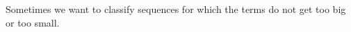\documentclass{ximera}
\begin{document}
%

Sometimes we want to classify sequences for which the terms do not get too big or too
small.  
\end{document}
